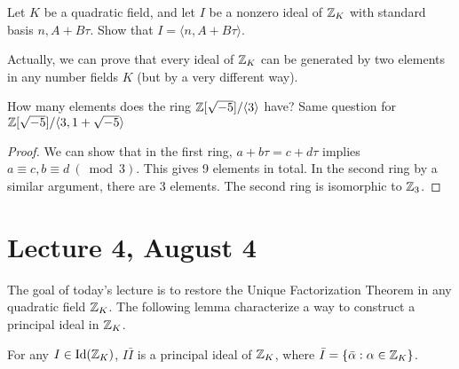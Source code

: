 \documentclass[12pt,twoside=semi,openright,numbers=noenddot]{scrbook}
\begin{document}
    \begin{corollary}
        Let $K$ be a quadratic field, and let $I$ be a nonzero ideal of $\mathbb Z_{K}$ with standard basis $n, A+B \tau$.
        Show that $I=\langle n, A+B \tau\rangle$.
    \end{corollary}
    Actually, we can prove that every ideal of $\mathbb Z_K$ can be generated by two elements in any number fields $K$ (but by a very different way).
\begin{problem}
    How many elements does the ring $\mathbb Z[\sqrt{-5}] /\langle 3\rangle$ have?
    Same question for $\mathbb Z[\sqrt{-5}] /\langle 3,1+\sqrt{-5}\rangle$
\end{problem}
    \begin{proof}
        We can show that in the first ring, $a+b\tau = c+d\tau$ implies $a \equiv c, b \equiv d \ (\bmod 3)$. This gives 
        9 elements in total. In the second ring by a similar argument, there are 3 elements. The second ring is isomorphic to $\mathbb Z_3$.
    \end{proof}

\section{Lecture 4, August 4}
The goal of today's lecture is to restore the Unique Factorization Theorem in any quadratic field $\mathbb Z_K$.
The following lemma characterize a way to construct a principal ideal in $\mathbb Z_K$.
\begin{lemma}
    For any $I \in \text{Id}(\mathbb Z_K)$, $I\bar{I}$ is a principal ideal of $\mathbb Z_K$, where $\bar{I} = \{\bar{\alpha}: \alpha \in \mathbb Z_K\}$.
\end{lemma}
\end{document}
